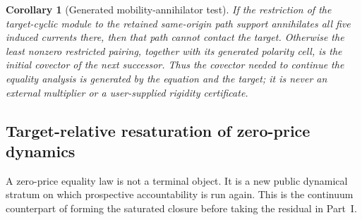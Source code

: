 \documentclass[11pt]{article}
\numberwithin{section}{part}
\theoremstyle{plain}
\newtheorem{corollary}[corollary]{Corollary}
\theoremstyle{definition}
\theoremstyle{remark}
\begin{document}
\begin{corollary}[Generated mobility-annihilator test]
\label{cor:generated-mobility-annihilator-test}
If the restriction of the target-cyclic module to the retained same-origin
path support annihilates all five induced currents there, then that path
cannot contact the target.  Otherwise the least nonzero restricted pairing,
together with its generated polarity cell, is the initial covector of the
next successor.  Thus the covector
needed to continue the equality analysis is generated by the equation and
the target; it is never an external multiplier or a user-supplied rigidity
certificate.
\end{corollary}

\subsection{Target-relative resaturation of zero-price dynamics}
\label{subsec:zero-price-resaturation}

A zero-price equality law is not a terminal object.  It is a new public
dynamical stratum on which prospective accountability is run again.  This is
the continuum counterpart of forming the saturated closure before taking the
residual in Part~I.
\end{document}
